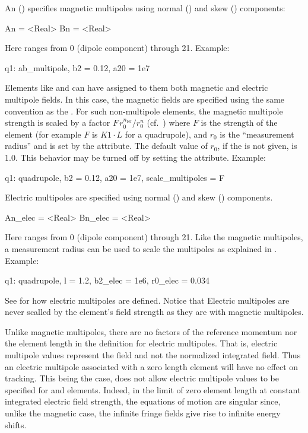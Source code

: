An  () specifies magnetic multipoles
using normal () and skew () components:
\begin{example}
  An = <Real>
  Bn = <Real>
\end{example}
Here  ranges from 0 (dipole component) through 21. Example:
\begin{example}
  q1: ab_multipole, b2 = 0.12, a20 = 1e7
\end{example}

Elements like  and  can have assigned
to them both magnetic and electric multipole fields. In this case, the
magnetic fields are specified using the same convention as the
.  For such non-multipole elements, the magnetic multipole
strength is scaled by a factor $F \, r_0^{n_\text{ref}} / r_0^n$
(cf.~) where $F$ is the strength of the element (for example
$F$ is $K1 \cdot L$ for a quadrupole), and $r_0$ is the ``measurement
radius'' and is set by the  attribute. The default value of
$r_0$, if the  is not given, is 1.0.  This behavior may be
turned off by setting the  attribute.  Example:
\begin{example}
  q1: quadrupole, b2 = 0.12, a20 = 1e7, scale_multipoles = F
\end{example}

Electric multipoles are specified using normal () and skew
() components. \begin{example}
  An_elec = <Real>
  Bn_elec = <Real>
\end{example}
Here  ranges from 0 (dipole component) through 21. Like the magnetic multipoles, 
a measurement radius  can be used to scale the multipoles as explained in 
.
Example:
\begin{example}
  q1: quadrupole, l = 1.2, b2_elec = 1e6, r0_elec = 0.034
\end{example}
See  for how electric multipoles are defined. Notice that Electric
multipoles are never scalled by the element's field strength as they are with magnetic
multipoles.

Unlike magnetic multipoles, there are no factors of the reference momentum nor the element
length in the definition for electric multipoles. That is, electric multipole values
represent the field and not the normalized integrated field. Thus an electric multipole
associated with a zero length element will have no effect on tracking. This being the
case, \bmad does not allow electric multipole values to be specified for 
and  elements. Indeed, in the limit of zero element length at constant
integrated electric field strength, the equations of motion are singular since, unlike the
magnetic case, the infinite fringe fields give rise to infinite energy shifts.

